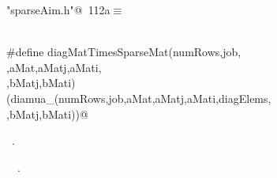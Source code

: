 \documentclass{article}
\begin{document}
\begin{description}
\begin{flushleft}
\begin{minipage}{\linewidth}
\end{minipage}\vspace{4ex}
\end{flushleft}
\item[ C=Diag*A]
\begin{flushleft} \small
\begin{minipage}{\linewidth}\label{scrap196}\raggedright\small
{} \verb@"sparseAim.h"@\nobreak\ {\footnotesize {112a}}$\equiv$
\vspace{-1ex}
\begin{list}{}{} \item
\mbox{}\verb@@\\
\mbox{}\verb@#define diagMatTimesSparseMat(numRows,job, \@\\
\mbox{}\verb@diagElems,aMat,aMatj,aMati, \@\\
\mbox{}\verb@bMat,bMatj,bMati) \@\\
\mbox{}\verb@(diamua_(numRows,job,aMat,aMatj,aMati,diagElems, \@\\
\mbox{}\verb@bMat,bMatj,bMati))@\\
\mbox{}\verb@@{\NWsep}
\end{list}
\vspace{-1.5ex}
\footnotesize
\begin{list}{}{\setlength{\itemsep}{-\parsep}\setlength{\itemindent}{-\leftmargin}}
\item \NWtxtFileDefBy\ .
\item \NWtxtIdentsUsed\nobreak\  \verb@job@\nobreak\ .
\item{}
\end{list}
\end{minipage}\vspace{4ex}
\end{flushleft}
\item[b= A x]
\begin{flushleft} \small
\begin{minipage}{\linewidth}\label{scrap197}\raggedright\small

\end{minipage}
\end{flushleft}
\end{description}
\end{document}
